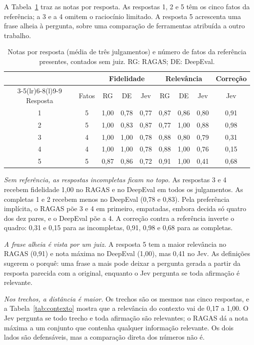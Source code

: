 \documentclass[12pt]{article}
\begin{document}
A Tabela~\ref{tab:respostas} traz as notas por resposta. As respostas 1, 2 e 5 têm
os cinco fatos da referência; a 3 e a 4 omitem o raciocínio limitado. A resposta 5
acrescenta uma frase alheia à pergunta, sobre uma comparação de ferramentas
atribuída a outro trabalho.

\begin{table}[htb]
\centering
\small
\caption{Notas por resposta (média de três julgamentos) e número de fatos da
referência presentes, contados sem juiz. RG: RAGAS; DE: DeepEval.}
\label{tab:respostas}
\begin{tabular}{@{}cc ccc ccc c@{}}
\toprule
 & & \multicolumn{3}{c}{Fidelidade} & \multicolumn{3}{c}{Relevância} & Correção \\
\cmidrule(lr){3-5}\cmidrule(lr){6-8}\cmidrule(l){9-9}
Resposta & Fatos & RG & DE & Jev & RG & DE & Jev & Jev \\
\midrule
1 & 5 & 1,00 & 0,78 & 0,77 & 0,87 & 0,86 & 0,80 & 0,91 \\
2 & 5 & 1,00 & 0,83 & 0,87 & 0,77 & 1,00 & 0,88 & 0,98 \\
3 & 4 & 1,00 & 1,00 & 0,78 & 0,88 & 0,80 & 0,79 & 0,31 \\
4 & 4 & 1,00 & 1,00 & 0,78 & 0,88 & 1,00 & 0,76 & 0,15 \\
5 & 5 & 0,87 & 0,86 & 0,72 & 0,91 & 1,00 & 0,41 & 0,68 \\
\bottomrule
\end{tabular}
\end{table}

\emph{Sem referência, as respostas incompletas ficam no topo.} As respostas 3 e 4
recebem fidelidade 1,00 no RAGAS e no DeepEval em todos os julgamentos. As completas
1 e 2 recebem menos no DeepEval (0,78 e 0,83). Pela preferência implícita, o RAGAS
põe 3 e 4 em primeiro, empatadas, embora decida só quatro dos dez pares, e o DeepEval põe
a 4. A correção contra a referência inverte
o quadro: 0,31 e 0,15 para as incompletas, 0,91, 0,98 e 0,68 para as completas.

\emph{A frase alheia é vista por um juiz.} A resposta 5 tem a maior relevância no
RAGAS (0,91) e nota máxima no DeepEval (1,00), mas 0,41 no Jev. As definições
sugerem o porquê: uma frase a mais pode deixar a pergunta gerada a partir da resposta
parecida com a original, enquanto o Jev pergunta se toda afirmação é relevante.

\emph{Nos trechos, a distância é maior.} Os trechos são os mesmos nas cinco
respostas, e a Tabela~\ref{tab:contexto} mostra que a relevância do contexto vai de
0,17 a 1,00. O Jev pergunta se todo trecho e toda afirmação são relevantes; o RAGAS dá a
nota máxima a um conjunto que contenha qualquer informação relevante. Os dois lados
são defensáveis, mas a comparação direta dos números não é.
\end{document}
